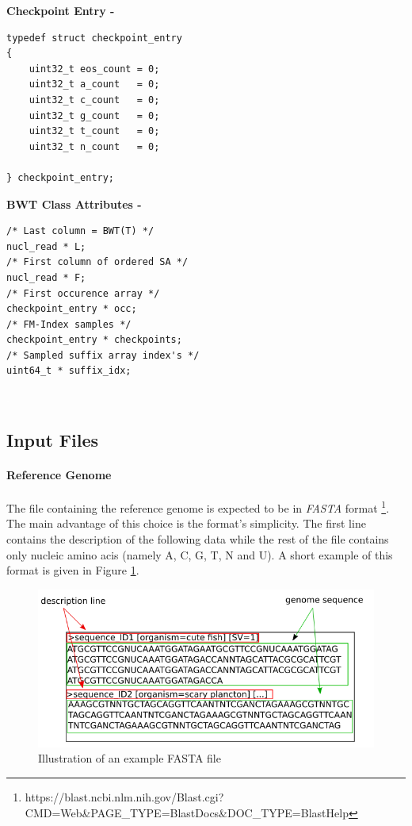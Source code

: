 \begin{minipage}[t]{0.4\textwidth}
	\textbf{Checkpoint Entry -} \\
	\vspace{-5mm}
	\begin{verbatim}   
typedef struct checkpoint_entry
{
    uint32_t eos_count = 0;
    uint32_t a_count   = 0;
    uint32_t c_count   = 0;
    uint32_t g_count   = 0;
    uint32_t t_count   = 0;
    uint32_t n_count   = 0;
	
} checkpoint_entry;
	\end{verbatim}
\end{minipage}
\hspace*{15mm}
\begin{minipage}[t]{0.5\textwidth}
		\textbf{BWT Class Attributes - }
\begin{verbatim}
/* Last column = BWT(T) */
nucl_read * L;
/* First column of ordered SA */
nucl_read * F;	
/* First occurence array */
checkpoint_entry * occ;	
/* FM-Index samples */
checkpoint_entry * checkpoints; 
/* Sampled suffix array index's */
uint64_t * suffix_idx;	

	\end{verbatim}
	\textcolor{white}{.}\\

	
	
\end{minipage}

\subsection{Input Files}

\paragraph{Reference Genome}
The file containing the reference genome is expected to be in \textsl{FASTA} format \footnote{https://blast.ncbi.nlm.nih.gov/Blast.cgi?CMD=Web&PAGE_TYPE=BlastDocs&DOC_TYPE=BlastHelp}. The main advantage of this choice is the format's simplicity. The first line contains the description of the following data while the rest of the file contains only nucleic amino acis (namely A, C, G, T, N and U). A short example of this format is given in Figure \ref{fig:fasta}.

\begin{figure}[H]
    \centering
    \includegraphics[scale = 0.5]{Figures/fastaex.png}
    \caption{Illustration of an example FASTA file }
    \label{fig:fasta}
\end{figure}

